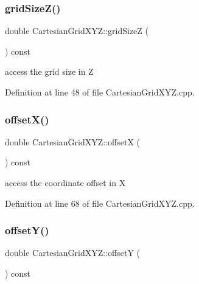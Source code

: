 \subsubsection{\texorpdfstring{grid\+Size\+Z()}{gridSizeZ()}}
{\footnotesize\ttfamily double Cartesian\+Grid\+X\+Y\+Z\+::grid\+SizeZ (\begin{DoxyParamCaption}{ }\end{DoxyParamCaption}) const}



access the grid size in Z 



Definition at line 48 of file Cartesian\+Grid\+X\+Y\+Z.\+cpp.

\hypertarget{class_d_d4hep_1_1_geometry_1_1_cartesian_grid_x_y_z_ad7d540b508988d27504ea67aebc2f3b3}{}\label{class_d_d4hep_1_1_geometry_1_1_cartesian_grid_x_y_z_ad7d540b508988d27504ea67aebc2f3b3} 
\subsubsection{\texorpdfstring{offset\+X()}{offsetX()}}
{\footnotesize\ttfamily double Cartesian\+Grid\+X\+Y\+Z\+::offsetX (\begin{DoxyParamCaption}{ }\end{DoxyParamCaption}) const}



access the coordinate offset in X 



Definition at line 68 of file Cartesian\+Grid\+X\+Y\+Z.\+cpp.

\hypertarget{class_d_d4hep_1_1_geometry_1_1_cartesian_grid_x_y_z_a9defd49d02b9e56711a3b91d7a4ed665}{}\label{class_d_d4hep_1_1_geometry_1_1_cartesian_grid_x_y_z_a9defd49d02b9e56711a3b91d7a4ed665} 
\subsubsection{\texorpdfstring{offset\+Y()}{offsetY()}}
{\footnotesize\ttfamily double Cartesian\+Grid\+X\+Y\+Z\+::offsetY (\begin{DoxyParamCaption}{ }\end{DoxyParamCaption}) const}



